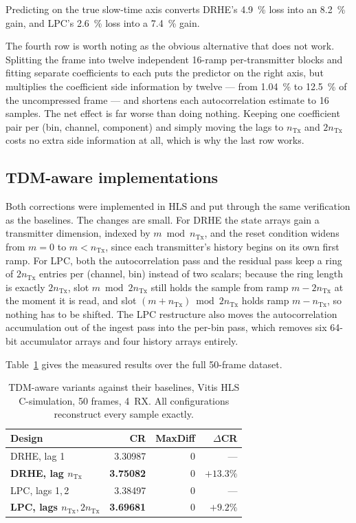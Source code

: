 \documentclass[10pt,twocolumn]{article}
\begin{document}
Predicting on the true slow-time axis converts DRHE's \SI{4.9}{\percent} loss
into an \SI{8.2}{\percent} gain, and LPC's \SI{2.6}{\percent} loss into a
\SI{7.4}{\percent} gain.

The fourth row is worth noting as the obvious alternative that does not work.
Splitting the frame into twelve independent 16-ramp per-transmitter blocks and
fitting separate coefficients to each puts the predictor on the right axis, but
multiplies the coefficient side information by twelve --- from \SI{1.04}{\percent}
to \SI{12.5}{\percent} of the uncompressed frame --- and shortens each
autocorrelation estimate to 16 samples. The net effect is far worse than doing
nothing. Keeping one coefficient pair per (bin, channel, component) and simply
moving the lags to $n_{\mathrm{Tx}}$ and $2n_{\mathrm{Tx}}$ costs no extra side
information at all, which is why the last row works.

\subsection{TDM-aware implementations}
\label{sec:tdmresults}

Both corrections were implemented in HLS and put through the same verification
as the baselines. The changes are small. For DRHE the state arrays gain a
transmitter dimension, indexed by $m \bmod n_{\mathrm{Tx}}$, and the reset
condition widens from $m = 0$ to $m < n_{\mathrm{Tx}}$, since each
transmitter's history begins on its own first ramp. For LPC, both the
autocorrelation pass and the residual pass keep a ring of $2n_{\mathrm{Tx}}$
entries per (channel, bin) instead of two scalars; because the ring length is
exactly $2n_{\mathrm{Tx}}$, slot $m \bmod 2n_{\mathrm{Tx}}$ still holds the
sample from ramp $m - 2n_{\mathrm{Tx}}$ at the moment it is read, and slot
$(m + n_{\mathrm{Tx}}) \bmod 2n_{\mathrm{Tx}}$ holds ramp $m - n_{\mathrm{Tx}}$,
so nothing has to be shifted. The LPC restructure also moves the
autocorrelation accumulation out of the ingest pass into the per-bin pass,
which removes six 64-bit accumulator arrays and four history arrays entirely.

Table~\ref{tab:tdmhls} gives the measured results over the full 50-frame
dataset.

\begin{table}[t]
\centering
\caption{TDM-aware variants against their baselines, Vitis HLS C-simulation,
50 frames, 4~RX. All configurations reconstruct every sample exactly.}
\label{tab:tdmhls}
\small
\setlength{\tabcolsep}{4pt}
\begin{tabular}{lrrr}
\toprule
Design & CR & MaxDiff & $\Delta$CR\\
\midrule
DRHE, lag 1                 & 3.30987 & 0 & ---\\
\textbf{DRHE, lag $n_{\mathrm{Tx}}$} & \textbf{3.75082} & 0 & $+13.3\%$\\
LPC, lags 1,\,2             & 3.38497 & 0 & ---\\
\textbf{LPC, lags $n_{\mathrm{Tx}},2n_{\mathrm{Tx}}$} & \textbf{3.69681} & 0 & $+9.2\%$\\
\bottomrule
\end{tabular}
\end{table}
\end{document}
